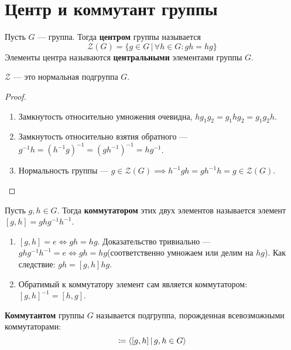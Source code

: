 \documentclass[../main.tex]{subfiles}
\begin{document}
\section{Центр и коммутант группы}
\begin{definition}
  Пусть $G$ --- группа. Тогда \textbf{центром} группы называется
  \begin{equation*}
    \mathcal{Z}(G) = \{g \in G \, | \, \forall h \in G\colon gh = hg\}
  \end{equation*}
  Элементы центра называются \textbf{центральными} элементами группы $G$.
\end{definition}
\begin{theorem-non}
  $\mathcal{Z}$ --- это нормальная подгруппа $G$.
\end{theorem-non}
\begin{proof}
  \begin{enumerate}
    \item Замкнутость относительно умножения очевидна, $hg_1g_2 = g_1hg_2 = g_1g_2h$.
    \item Замкнутость относительно взятия обратного --- $g^{-1}h = (h^{-1}g)^{-1} = (gh^{-1})^{-1} = hg^{-1}$.
    \item Нормальность группы --- $g \in \mathcal{Z}(G) \implies h^{-1}gh = gh^{-1}h = g \in \mathcal{Z}(G)$.
  \end{enumerate}
\end{proof}

\begin{definition}
  Пусть $g, h \in G$. Тогда \textbf{коммутатором} этих двух элементов называется элемент $[g, h] = ghg^{-1}h^{-1}$.
\end{definition}
\begin{remark}
  \begin{enumerate}
    \item $[g, h] = e \iff gh = hg$. Доказательство тривиально --- $ghg^{-1}h^{-1} = e \iff gh = hg$(соответственно умножаем или делим на $hg$). Как следствие: $gh = [g, h]hg$.
    \item Обратимый к коммутатору элемент сам является коммутатором: $[g, h]^{-1} = [h, g]$.
  \end{enumerate}
\end{remark}

\begin{definition}
  \textbf{Коммутантом} группы $G$ называется подгруппа, порожденная всевозможными коммутаторами:
  \begin{equation*}
    [G, G] \coloneqq \lan [g, h] \, | \, g,h \in G \ran
  \end{equation*}
\end{definition}
\end{document}
